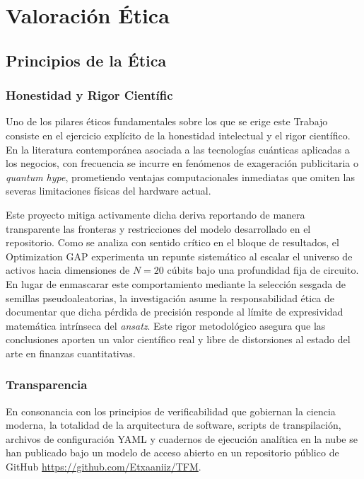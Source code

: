 \chapter{Valoración Ética}
\label{ch:valoracion_etica}

\section{Principios de la Ética}
\label{sec:cumplimiento_etica_profesional}

\subsection{Honestidad y Rigor Científic}
Uno de los pilares éticos fundamentales sobre los que se erige este Trabajo consiste en el ejercicio explícito de la honestidad intelectual y el rigor científico. En la literatura contemporánea asociada a las tecnologías cuánticas aplicadas a los negocios, con frecuencia se incurre en fenómenos de exageración publicitaria o \textit{quantum hype}, prometiendo ventajas computacionales inmediatas que omiten las severas limitaciones físicas del hardware actual. 

Este proyecto mitiga activamente dicha deriva reportando de manera transparente las fronteras y restricciones del modelo desarrollado en el repositorio. Como se analiza con sentido crítico en el bloque de resultados, el Optimization GAP experimenta un repunte sistemático al escalar el universo de activos hacia dimensiones de $N=20$ cúbits bajo una profundidad fija de circuito. En lugar de enmascarar este comportamiento mediante la selección sesgada de semillas pseudoaleatorias, la investigación asume la responsabilidad ética de documentar que dicha pérdida de precisión responde al límite de expresividad matemática intrínseca del \textit{ansatz}. Este rigor metodológico asegura que las conclusiones aporten un valor científico real y libre de distorsiones al estado del arte en finanzas cuantitativas.

\subsection{Transparencia}
En consonancia con los principios de verificabilidad que gobiernan la ciencia moderna, la totalidad de la arquitectura de software, scripts de transpilación, archivos de configuración YAML y cuadernos de ejecución analítica en la nube se han publicado bajo un modelo de acceso abierto en un repositorio público de GitHub {\url{https://github.com/Etxaaniiz/TFM}}.

